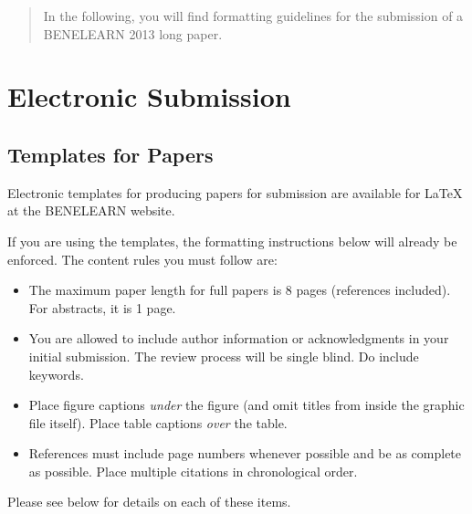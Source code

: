 \documentclass{article}
\begin{document}

\begin{abstract}

In the following, you will find formatting guidelines for the submission of a BENELEARN 2013 long paper.  

\end{abstract}

\section{Electronic Submission}
\label{submission}

\subsection{Templates for Papers}

Electronic templates for producing papers for submission are available for \LaTeX\/ at the BENELEARN website.

If you are using the templates, the formatting instructions below will already be enforced. The content rules you must follow are:
\begin{itemize}
\item The maximum paper length for full papers is 8 pages (references included).  For abstracts, it is 1 page.
\item You are allowed to include author information or acknowledgments in your initial submission. The review process will be single blind. Do include keywords.
\item Place figure captions {\em under} the figure (and omit titles from inside the graphic file itself). Place table captions {\em over} the table.
\item References must include page numbers whenever possible and be as complete as possible. Place multiple citations in chronological order.
\end{itemize}
Please see below for details on each of these items.
\end{document}
